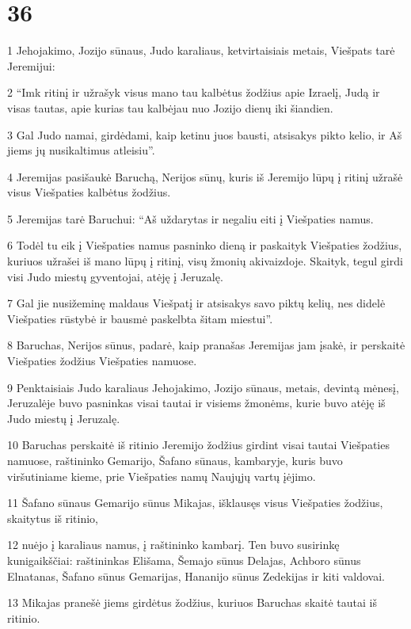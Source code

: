 \chapter{36}


\par 1 Jehojakimo, Jozijo sūnaus, Judo karaliaus, ketvirtaisiais metais, Viešpats tarė Jeremijui: 
\par 2 “Imk ritinį ir užrašyk visus mano tau kalbėtus žodžius apie Izraelį, Judą ir visas tautas, apie kurias tau kalbėjau nuo Jozijo dienų iki šiandien. 
\par 3 Gal Judo namai, girdėdami, kaip ketinu juos bausti, atsisakys pikto kelio, ir Aš jiems jų nusikaltimus atleisiu”. 
\par 4 Jeremijas pasišaukė Baruchą, Nerijos sūnų, kuris iš Jeremijo lūpų į ritinį užrašė visus Viešpaties kalbėtus žodžius. 
\par 5 Jeremijas tarė Baruchui: “Aš uždarytas ir negaliu eiti į Viešpaties namus. 
\par 6 Todėl tu eik į Viešpaties namus pasninko dieną ir paskaityk Viešpaties žodžius, kuriuos užrašei iš mano lūpų į ritinį, visų žmonių akivaizdoje. Skaityk, tegul girdi visi Judo miestų gyventojai, atėję į Jeruzalę. 
\par 7 Gal jie nusižeminę maldaus Viešpatį ir atsisakys savo piktų kelių, nes didelė Viešpaties rūstybė ir bausmė paskelbta šitam miestui”. 
\par 8 Baruchas, Nerijos sūnus, padarė, kaip pranašas Jeremijas jam įsakė, ir perskaitė Viešpaties žodžius Viešpaties namuose. 
\par 9 Penktaisiais Judo karaliaus Jehojakimo, Jozijo sūnaus, metais, devintą mėnesį, Jeruzalėje buvo pasninkas visai tautai ir visiems žmonėms, kurie buvo atėję iš Judo miestų į Jeruzalę. 
\par 10 Baruchas perskaitė iš ritinio Jeremijo žodžius girdint visai tautai Viešpaties namuose, raštininko Gemarijo, Šafano sūnaus, kambaryje, kuris buvo viršutiniame kieme, prie Viešpaties namų Naujųjų vartų įėjimo. 
\par 11 Šafano sūnaus Gemarijo sūnus Mikajas, išklausęs visus Viešpaties žodžius, skaitytus iš ritinio, 
\par 12 nuėjo į karaliaus namus, į raštininko kambarį. Ten buvo susirinkę kunigaikščiai: raštininkas Elišama, Šemajo sūnus Delajas, Achboro sūnus Elnatanas, Šafano sūnus Gemarijas, Hananijo sūnus Zedekijas ir kiti valdovai. 
\par 13 Mikajas pranešė jiems girdėtus žodžius, kuriuos Baruchas skaitė tautai iš ritinio. 
